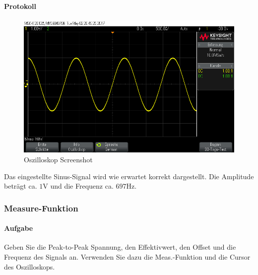 \documentclass[10pt]{scrreprt}
\begin{document}
        \paragraph{Protokoll}
        \begin{center}
            \begin{figure}[H]
                \includegraphics[width=\textwidth]{scope_14.png}
              \caption{Oszilloskop Screenshot}
            \end{figure}
        \end{center}
        Das eingestellte Sinus-Signal wird wie erwartet korrekt dargestellt. Die Amplitude
        beträgt ca. $1\si{\volt}$ und die Frequenz ca. $697\si{\hertz}$.
        \subsubsection{Measure-Funktion}
        \paragraph{Aufgabe}
        Geben Sie die Peak-to-Peak Spannung, den Effektivwert, den Offset und die Frequenz
        des Signals an. Verwenden Sie dazu die \glqq{}Meas.\grqq-{}Funktion und die Cursor des
        Oszilloskops.
\end{document}
